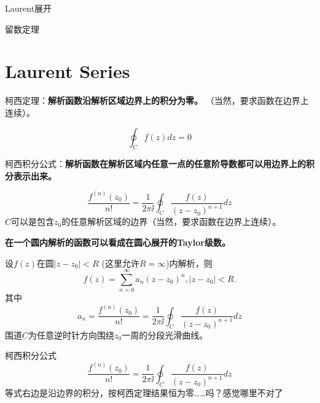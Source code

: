 \documentclass[CJK]{beamer}
\date{}
\begin{document}


\begin{frame}
\bch
\bitem
\item{Laurent展开}
\item{留数定理}
\eitem
\ech
\end{frame}

\section{Laurent Series}

\begin{frame}
  \bch
  柯西定理：{\bf \blue 解析函数沿解析区域边界上的积分为零。}
  （当然，要求函数在边界上连续）。
  

  $$\oint_C f(z) dz  = 0 $$
  \ech
\end{frame}


\begin{frame}
  \bch
  柯西积分公式：{\bf \blue 解析函数在解析区域内任意一点的任意阶导数都可以用边界上的积分表示出来。}
  
  $$\frac{f^{(n)}(z_0)}{n!} =  \frac{1}{2\pi \ii}\oint_C \frac{f(z)}{(z-z_0)^{n+1}}dz$$
  $C$可以是包含$z_0$的任意解析区域的边界（当然，要求函数在边界上连续）。
  \ech
\end{frame}

\begin{frame}
  \bch
      {\bf \blue 在一个圆内解析的函数可以看成在圆心展开的Taylor级数。}

      
  设$f(z)$在圆$|z-z_0|<R$ (这里允许$R=\infty$)内解析，则
  $$f(z) = \sum_{n=0}^{\infty} a_n (z-z_0)^n, |z-z_0|<R.$$
  其中
  $$a_n = \frac{f^{(n)}(z_0)}{n!} =  \frac{1}{2\pi \ii}\oint_C \frac{f(z)}{(z-z_0)^{n+1}}dz$$
  围道$C$为任意逆时针方向围绕$z_0$一周的分段光滑曲线。
  \ech
\end{frame}


\begin{frame}
  \bch
  
  柯西积分公式
    $$\frac{f^{(n)}(z_0)}{n!} =  \frac{1}{2\pi \ii}\oint_{C} \frac{f(z)}{(z-z_0)^{n+1}}dz$$
  等式右边是沿边界的积分，按柯西定理结果恒为零……吗？感觉哪里不对了\wulian
  \ech
\end{frame}
\end{document}
